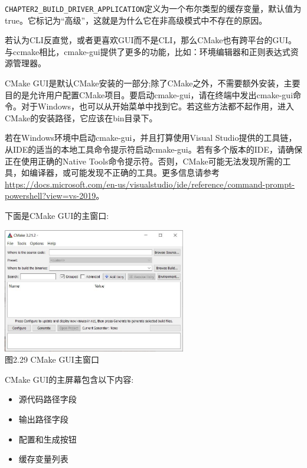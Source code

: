 \texttt{CHAPTER2\_BUILD\_DRIVER\_APPLICATION}定义为一个布尔类型的缓存变量，默认值为true。它标记为“高级”，这就是为什么它在非高级模式中不存在的原因。


若认为CLI反直觉，或者更喜欢GUI而不是CLI，那么CMake也有跨平台的GUI。与ccmake相比，cmake-gui提供了更多的功能，比如：环境编辑器和正则表达式资源管理器。

CMake GUI是默认CMake安装的一部分;除了CMake之外，不需要额外安装，主要目的是允许用户配置CMake项目。要启动cmake-gui，请在终端中发出cmake-gui命令。对于Windows，也可以从开始菜单中找到它。若这些方法都不起作用，进入CMake的安装路径，它应该在bin目录下。

\begin{tcolorbox}[colback=webgreen!5!white,colframe=webgreen!75!black,title=Note]
若在Windows环境中启动cmake-gui，并且打算使用Visual Studio提供的工具链，从IDE的适当的本地工具命令提示符启动cmake-gui。若有多个版本的IDE，请确保正在使用正确的Native Tools命令提示符。否则，CMake可能无法发现所需的工具，如编译器，或可能发现不正确的工具。更多信息请参考\url{https://docs.microsoft.com/en-us/visualstudio/ide/reference/command-prompt-powershell?view=vs-2019}。
\end{tcolorbox}

下面是CMake GUI的主窗口:

\begin{center}
\includegraphics[width=0.6\textwidth]{content/1/chapter2/images/29.jpg}\\
图2.29 CMake GUI主窗口
\end{center}

CMake GUI的主屏幕包含以下内容:

\begin{itemize}
\item 
源代码路径字段

\item 
输出路径字段

\item 
配置和生成按钮

\item 
缓存变量列表
\end{itemize}

